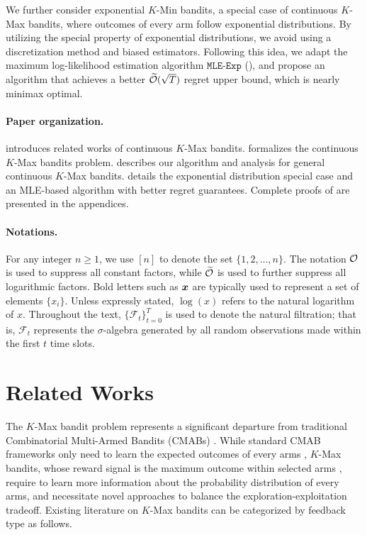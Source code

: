 We further consider exponential $K$-Min bandits, a special case of continuous $K$-Max bandits, where outcomes of every arm follow exponential distributions. By utilizing the special property of exponential distributions, we avoid using a discretization method and biased estimators. Following this idea, we adapt the maximum log-likelihood estimation algorithm $\texttt{MLE-Exp}$ (), and propose an algorithm that achieves a better $\widetilde{{\mathcal{O}}}(\sqrt{T})$ regret upper bound, which is nearly minimax optimal.



\paragraph{Paper organization.}
 introduces related works of continuous $K$-Max bandits.  formalizes the continuous $K$-Max bandits problem.
%
 describes our algorithm and analysis for general continuous $K$-Max bandits.
 details the exponential distribution special case and an MLE-based algorithm with better regret guarantees. Complete proofs of  are presented in the appendices.

\paragraph{Notations.} 
For any integer $n \ge 1$, we use $[n]$ to denote the set $\{1,2,\ldots,n\}$. The notation ${\mathcal{O}}$ is used to suppress all constant factors, while $\widetilde{{\mathcal{O}}}$ is used to further suppress all logarithmic factors. Bold letters such as ${\bm{x}}$ are typically used to represent a set of elements $\{x_i\}$. Unless expressly stated, $\log(x)$ refers to the natural logarithm of $x$. Throughout the text, $\{\mathcal F_t\}_{t=0}^T$ is used to denote the natural filtration; that is, $\mathcal F_t$ represents the $\sigma$-algebra generated by all random observations made within the first $t$ time slots.





\section{Related Works}\label{sec:related-works}
The $K$-Max bandit problem represents a significant departure from traditional Combinatorial Multi-Armed Bandits (CMABs) \citep{cesa2012combinatorial,chen2013combinatorial}. While standard CMAB frameworks only need to learn the expected outcomes of every arms \citep{chen2013combinatorial,chen2014combinatorial,kveton2015tight,combes2015combinatorial,liu2023contextual}, $K$-Max bandits, whose reward signal is the maximum outcome within selected arms \citep{goel2006asking,gopalan2014thompson}, require to learn more information about the probability distribution of every arms, and necessitate novel approaches to balance the exploration-exploitation tradeoff.
Existing literature on $K$-Max bandits can be categorized by feedback type as follows.

